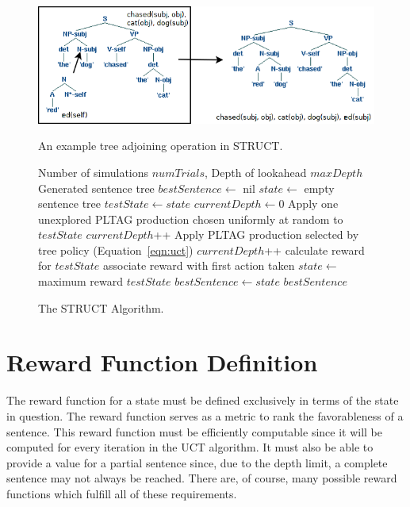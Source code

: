 \begin{figure}[t]
\centering
\includegraphics[width= 0.7 \linewidth]{adjoin-example.png}\label{examples-a}
\caption{An example tree adjoining operation in STRUCT.}
\end{figure}

\begin{figure}
\caption{The STRUCT Algorithm.}\label{uct-code}
\begin{algorithmic}[1]
\REQUIRE Number of simulations $numTrials$, Depth of lookahead $maxDepth$
\ENSURE Generated sentence tree
\STATE $bestSentence \gets$ nil
\STATE $state \gets$ empty sentence tree
		\STATE $testState \gets state$
		\STATE $currentDepth \gets 0$
			\STATE Apply one unexplored PLTAG production chosen
                        uniformly at random to $testState$
			\STATE $currentDepth$++
		\ENDIF
			\STATE Apply PLTAG production selected by tree
                        policy (Equation~\ref{eqn:uct})
			\STATE $currentDepth$++
		\ENDWHILE
		\STATE calculate reward for $testState$
		\STATE associate reward with first action taken
	\ENDFOR
	\STATE $state \gets$ maximum reward $testState$
		\STATE $bestSentence \gets state$
	\ENDIF
\ENDWHILE
\ENDWHILE
\RETURN $bestSentence$
\end{algorithmic}
\end{figure}

\section{Reward Function Definition}

 The reward function for a state must be defined exclusively in terms
 of the state in question.  The reward function serves as a metric to
 rank the favorableness of a sentence.  This reward function must be
 efficiently computable since it will be computed for every iteration
 in the UCT algorithm.  It must also be able to provide a value for a
 partial sentence since, due to the depth limit, a complete sentence
 may not always be reached.  There are, of course, many
possible reward functions which fulfill all of these requirements.

